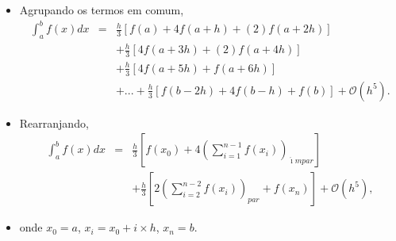\documentclass[xcolor=table]{beamer}
\newenvironment{stepitemize}{\begin{itemize}[<+->]}{\end{itemize} }
\begin{document}
\begin{frame}%

\begin{stepitemize}
\item Agrupando os termos em comum,%
\begin{eqnarray*}
\int_{a}^{b}f\left( x\right) dx &=&\frac{h}{3}\left[ f\left( a\right)
+4f\left( a+h\right) +\left( 2\right) f\left( a+2h\right) \right]  \\
&&+\frac{h}{3}\left[ 4f\left( a+3h\right) +\left( 2\right) f\left(
a+4h\right) \right]  \\
&&+\frac{h}{3}\left[ 4f\left( a+5h\right) +f\left( a+6h\right) \right]  \\
&&+...+\frac{h}{3}\left[ f\left( b-2h\right) +4f\left( b-h\right) +f\left(
b\right) \right] +\mathcal{O}\left( h^{5}\right) .
\end{eqnarray*}

\item Rearranjando,%
\begin{eqnarray*}
\int_{a}^{b}f\left( x\right) dx &=&\frac{h}{3}\left[ f\left( x_{0}\right)
+4\left( \sum_{i=1}^{n-1}f\left( x_{i}\right) \right) _{\acute{\imath}mpar}%
\right]  \\
&&+\frac{h}{3}\left[ 2\left( \sum_{i=2}^{n-2}f\left( x_{i}\right) \right)
_{par}+f\left( x_{n}\right) \right] +\mathcal{O}\left( h^{5}\right),
\end{eqnarray*}

\item onde $x_{0}=a$, $x_{i}=x_{0}+i\times h$, $x_{n}=b$.
\end{stepitemize}

\end{frame}%
\end{document}

